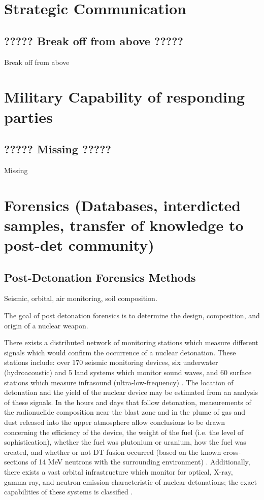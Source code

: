 \documentclass{report}
\begin{document}
\section{Strategic Communication} 

\subsection{????? Break off from above ?????}

Break off from above



\section{Military Capability of responding parties }

\subsection{????? Missing ?????}

Missing




\section{Forensics (Databases, interdicted samples, transfer of knowledge to post-det community)}

           
\subsection{Post-Detonation Forensics Methods}

Seismic, orbital, air monitoring, soil composition.

The goal of post detonation forensics is to determine the design, composition, and origin of a nuclear weapon. 

There exists a distributed network of monitoring stations which measure different signals which would confirm the occurrence of a nuclear detonation. These stations include: over 170 seismic monitoring devices, six underwater (hydroacoustic) and 5 land systems which monitor sound waves, and 60 surface stations which measure infrasound (ultra-low-frequency) \cite{Lane2012}. The location of detonation and the yield of the nuclear device may be estimated from an analysis of these signals. In the hours and days that follow detonation, measurements of the radionuclide composition near the blast zone and in the plume of gas and dust released into the upper atmosphere allow conclusions to be drawn concerning the efficiency of the device, the weight of the fuel (i.e. the level of sophistication), whether the fuel was plutonium or uranium, how the fuel was created, and whether or not DT fusion occurred (based on the known cross-sections of 14 MeV neutrons with the surrounding environment) \cite{Davis2011}. Additionally, there exists a vast orbital infrastructure which monitor for optical, X-ray, gamma-ray, and neutron emission characteristic of nuclear detonations; the exact capabilities of these systems is classified \cite{1446400}. 
\end{document}
